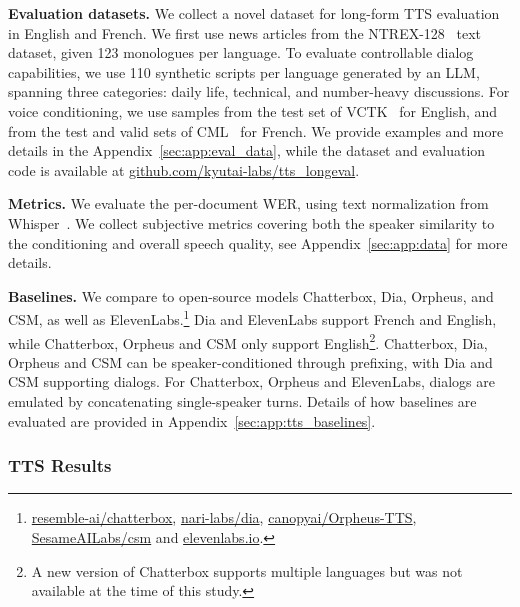 \documentclass{article}
\begin{document}
\textbf{Evaluation datasets.} We collect a novel dataset for long-form TTS evaluation in English and French. We first use news articles from the NTREX-128~\citep{federmann-etal-2022-ntrex} text dataset,
given 123 monologues per language. To evaluate controllable dialog capabilities, we use 110 synthetic scripts per language generated by an LLM, spanning three categories: daily life, technical, and number-heavy discussions. For voice conditioning, we use samples from the test set of VCTK~\citep{Yamagishi2019CSTRVC} for English, and from the test and valid sets of CML~\citep{Cmltts2023} for French. We provide examples and more details in the Appendix~\ref{sec:app:eval_data}, while the dataset and evaluation code is available at \href{https://github.com/kyutai-labs/tts_longeval}{github.com/kyutai-labs/tts\_longeval}.

\textbf{Metrics.} We evaluate the per-document WER, using text normalization from Whisper~\citep{whisper}.
We collect subjective metrics covering both the speaker similarity to the conditioning and overall speech quality, see Appendix~\ref{sec:app:data} for more details. 

\textbf{Baselines.} We compare to open-source models Chatterbox, Dia, Orpheus, and CSM, as well as ElevenLabs.\footnote{
\href{https://github.com/resemble-ai/chatterbox}{resemble-ai/chatterbox},
\href{https://github.com/nari-labs/dia}{nari-labs/dia},
\href{https://github.com/canopyai/Orpheus-TTS}{canopyai/Orpheus-TTS},
\href{https://github.com/SesameAILabs/csm}{SesameAILabs/csm} and \href{https://elevenlabs.io/}{elevenlabs.io}.} Dia and ElevenLabs support French and English, while Chatterbox, Orpheus and CSM only support English\footnote{A new version of Chatterbox supports multiple languages but was not available at the time of this study.}. Chatterbox, Dia, Orpheus and CSM can be speaker-conditioned through prefixing, with Dia and CSM supporting dialogs. For Chatterbox, Orpheus and ElevenLabs, dialogs are emulated by concatenating single-speaker turns. Details of how baselines are evaluated are provided in Appendix~\ref{sec:app:tts_baselines}.

\subsubsection{TTS Results}
\end{document}
